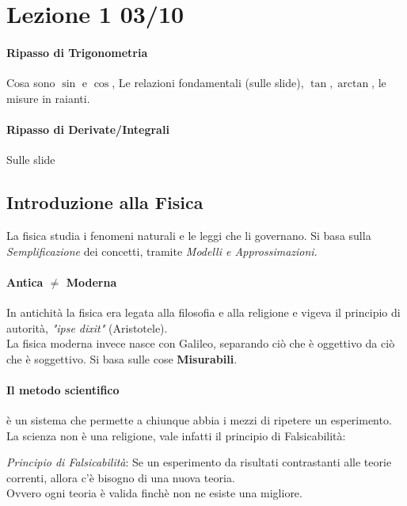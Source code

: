 \documentclass[12pt, a4paper, openany]{book}
\begin{document}
\section{Lezione 1 03/10}
\paragraph*{Ripasso di Trigonometria}
Cosa sono $\sin$ e $\cos$, Le relazioni fondamentali (sulle slide), $\tan, \arctan$, le misure in raianti. 
\paragraph*{Ripasso di Derivate/Integrali}
Sulle slide

\subsection*{Introduzione alla Fisica}
La fisica studia i fenomeni naturali e le leggi che li governano.
Si basa sulla \emph{Semplificazione} dei concetti, tramite \emph{Modelli e Approssimazioni}.

\paragraph*{Antica $\neq$ Moderna} In antichità la fisica era legata alla filosofia e alla religione
e vigeva il principio di autorità, \emph{"ipse dixit"} (Aristotele).
\\La fisica moderna invece nasce con Galileo, separando ciò che è oggettivo da ciò che è soggettivo.
Si basa sulle cose \textbf{Misurabili}.
\paragraph*{Il metodo scientifico} è un sistema che permette a chiunque abbia i mezzi di ripetere un esperimento.
La scienza non è una religione, vale infatti il principio di Falsicabilità:
\begin{center}
    \emph{Principio di Falsicabilità}: Se un esperimento da risultati contrastanti alle teorie correnti, allora c'è bisogno di una nuova teoria.
    \\Ovvero ogni teoria è valida finchè non ne esiste una migliore.
\end{center}
\end{document}
